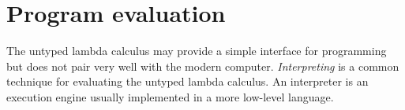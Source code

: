 \chapter{Program evaluation}
The untyped lambda calculus may provide a simple interface for programming but does not pair very well with the modern computer.
\textit{Interpreting} is a common technique for evaluating the untyped lambda calculus.
An interpreter is an execution engine usually implemented in a more low-level language.






